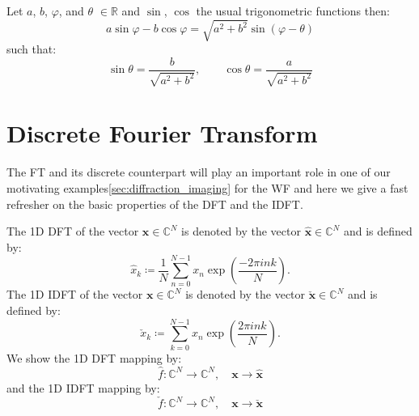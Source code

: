 	\begin{Lem}\label{lemma:inverse_a_sin_b_cos}
		Let $a$, $b$, $\varphi$, and $\theta$ $\in \mathbb{R}$ and $\sin$, $\cos$ 
        the usual trigonometric functions then:
		\begin{equation}
			a\sin \varphi - b\cos \varphi  = \sqrt{a^2+b^2}\sin(\varphi - \theta)
		\end{equation}
		such that:
		\begin{equation}
			\sin\theta=\frac{b}{\sqrt{a^2+b^2}}, \qquad \cos\theta = \frac{a}{\sqrt{a^2+b^2}}
		\end{equation}
		\end{Lem}


\section{Discrete Fourier Transform}
The \ac{FT} and its discrete counterpart will play an important role in one of our motivating examples\cref{sec:diffraction_imaging} 
for the \ac{WF} and here we give a fast refresher on the basic properties of the \ac{DFT} and the \ac{IDFT}.

\begin{Def}\label{def:1ddft_1didft}
    The 1D \ac{DFT} of the vector $\boldsymbol{x} \in \mathbb{C}^{N}$ is denoted by the vector $\hat {\boldsymbol{x}} \in \mathbb{C}^{N}$ and is defined by:
    \begin{equation}\label{eq:1ddft}
        {\hat x}_k \coloneqq \frac{1}{N}\sum_{n=0}^{N-1} x_n\exp\left({\frac{-2\pi ink}{N}}\right).
    \end{equation}
    The 1D \ac{IDFT} of the vector $\boldsymbol{x} \in \mathbb{C}^{N}$ is denoted by the vector $\check {\boldsymbol{x}} \in \mathbb{C}^{N}$ and is defined by:
    \begin{equation}\label{eq:1didft}
        \check {x}_k \coloneqq \sum_{k=0}^{N-1}x_{n}\exp\left({\frac{2\pi ink}{N}}\right).
    \end{equation}   
    We show the 1D \ac{DFT} mapping by:
    \begin{equation}
        \hat f \colon \mathbb{C}^N \to \mathbb{C}^N , \quad \boldsymbol{x} \to \hat{\boldsymbol{x}}
    \end{equation} 
    and the 1D \ac{IDFT} mapping by:
    \begin{equation}
        \check f \colon \mathbb{C}^N \to \mathbb{C}^N , \quad \boldsymbol{x} \to \check{\boldsymbol{x}}
    \end{equation} 
\end{Def}

